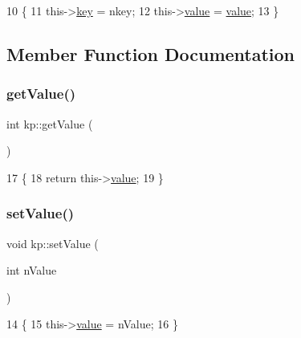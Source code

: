 \begin{DoxyCode}
10                               \{
11         this->\mbox{\hyperlink{structkp_ab46106230758af92770fa00fd317e273}{key}} = nkey;
12         this->\mbox{\hyperlink{structkp_a743afbf5f8333e19be5ade0ed1a0caa4}{value}} = \mbox{\hyperlink{structkp_a743afbf5f8333e19be5ade0ed1a0caa4}{value}};
13     \}
\end{DoxyCode}


\subsection{Member Function Documentation}
\mbox{\label{structkp_a366eb1c99529bddfd7a03d164445fbe5}} 
\subsubsection{\texorpdfstring{get\+Value()}{getValue()}}
{\footnotesize\ttfamily int kp\+::get\+Value (\begin{DoxyParamCaption}{ }\end{DoxyParamCaption})\hspace{0.3cm}{\ttfamily [inline]}}


\begin{DoxyCode}
17                    \{
18         \textcolor{keywordflow}{return} this->\mbox{\hyperlink{structkp_a743afbf5f8333e19be5ade0ed1a0caa4}{value}};
19     \}
\end{DoxyCode}
\mbox{\label{structkp_a58583317a8847b368728e8822b01e516}} 
\subsubsection{\texorpdfstring{set\+Value()}{setValue()}}
{\footnotesize\ttfamily void kp\+::set\+Value (\begin{DoxyParamCaption}\item[{int}]{n\+Value }\end{DoxyParamCaption})\hspace{0.3cm}{\ttfamily [inline]}}


\begin{DoxyCode}
14                               \{
15         this->\mbox{\hyperlink{structkp_a743afbf5f8333e19be5ade0ed1a0caa4}{value}} = nValue;
16     \}
\end{DoxyCode}


